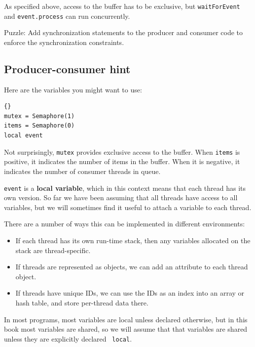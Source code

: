 \documentclass{book}
\newcommand{\clearemptydoublepage}{\newpage\cleardoublepage}
\begin{document}
As specified above, access to the buffer has to be exclusive,
but {\tt waitForEvent} and {\tt event.process}
can run concurrently.

Puzzle: Add synchronization statements to the producer and
consumer code to enforce the synchronization constraints.

\clearemptydoublepage
\subsection{Producer-consumer hint}

Here are the variables you might want to use:

\begin{latin}
\begin{latin}
\begin{lstlisting}[title={Producer-consumer initialization}]{}
mutex = Semaphore(1)
items = Semaphore(0)
local event
\end{lstlisting}
\end{latin}
\end{latin}

Not surprisingly, {\tt mutex} provides exclusive access to
the buffer.  When {\tt items} is positive, it indicates the
number of items in the buffer.  When it is negative, it
indicates the number of consumer threads in queue.

{\tt event} is a {\bf local variable}, which in this context means
that each thread has its own version.
So far we have been assuming that all threads have access
to all variables, but we will sometimes find it useful to
attach a variable to each thread.

There are a number of ways this can be implemented in different
environments:

\begin{itemize}

\item If each thread has its own run-time stack, then any variables
allocated on the stack are thread-specific.

\item If threads are represented as objects, we can add an attribute
to each thread object.

\item If threads have unique IDs, we can use the IDs as an index
into an array or hash table, and store per-thread data there.

\end{itemize}

In most programs, most variables are local unless declared otherwise,
but in this book most variables are shared, so we will assume that
that variables are shared unless they are explicitly declared {\tt
local}.
\end{document}
